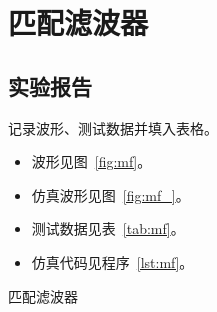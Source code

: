 \documentclass[../main]{subfiles}
\begin{document}
\chapter{匹配滤波器}%
\label{cha:mf}

\section{实验报告}%
\label{sec:\arabic{chapter}report}

\begin{Exercise}
  记录波形、测试数据并填入表格。
\end{Exercise}

\begin{Answer}
  \begin{itemize}
    \item 波形见图~\ref{fig:mf}。
    \item 仿真波形见图~\ref{fig:mf_}。
    \item 测试数据见表~\ref{tab:mf}。
    \item 仿真代码见程序~\ref{lst:mf}。
  \end{itemize}
\end{Answer}

\begin{table}[htbp]
  \centering
  \caption{匹配滤波器}%
  \label{tab:mf}
  \small
\end{table}
\end{document}
